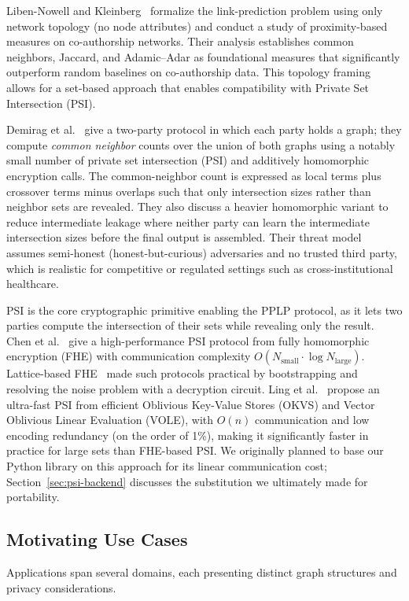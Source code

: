\documentclass[sigconf]{acmart}
\begin{document}
Liben-Nowell and Kleinberg~\cite{liben-nowell2007link} formalize the link-prediction problem using only network topology (no node attributes) and conduct a study of proximity-based measures on co-authorship networks. Their analysis establishes common neighbors, Jaccard, and Adamic--Adar as foundational measures that significantly outperform random baselines on co-authorship data. This topology framing allows for a set-based approach that enables compatibility with Private Set Intersection (PSI).

Demirag et al.~\cite{Demirag2022} give a two-party protocol in which each party holds a graph; they compute \emph{common neighbor} counts over the union of both graphs using a notably small number of private set intersection (PSI) and additively homomorphic encryption calls. The common-neighbor count is expressed as local terms plus crossover terms minus overlaps such that only intersection sizes rather than neighbor sets are revealed. They also discuss a heavier homomorphic variant to reduce intermediate leakage where neither party can learn the intermediate intersection sizes before the final output is assembled. Their threat model assumes semi-honest (honest-but-curious) adversaries and no trusted third party, which is realistic for competitive or regulated settings such as cross-institutional healthcare.

PSI is the core cryptographic primitive enabling the PPLP protocol, as it lets two parties compute the intersection of their sets while revealing only the result. Chen et al.~\cite{chen2017fast} give a high-performance PSI protocol from fully homomorphic encryption (FHE) with communication complexity $O(N_{\text{small}} \cdot \log N_{\text{large}})$. Lattice-based FHE~\cite{gentry2009lattice} made such protocols practical by bootstrapping and resolving the noise problem with a decryption circuit. Ling et al.~\cite{ling2025ultrafast} propose an ultra-fast PSI from efficient Oblivious Key-Value Stores (OKVS) and Vector Oblivious Linear Evaluation (VOLE), with $O(n)$ communication and low encoding redundancy (on the order of 1\%), making it significantly faster in practice for large sets than FHE-based PSI. We originally planned to base our Python library on this approach for its linear communication cost; Section~\ref{sec:psi-backend} discusses the substitution we ultimately made for portability.

\subsection{Motivating Use Cases}
\label{sec:motivating}
Applications span several domains, each presenting distinct graph structures and privacy considerations.
\end{document}
